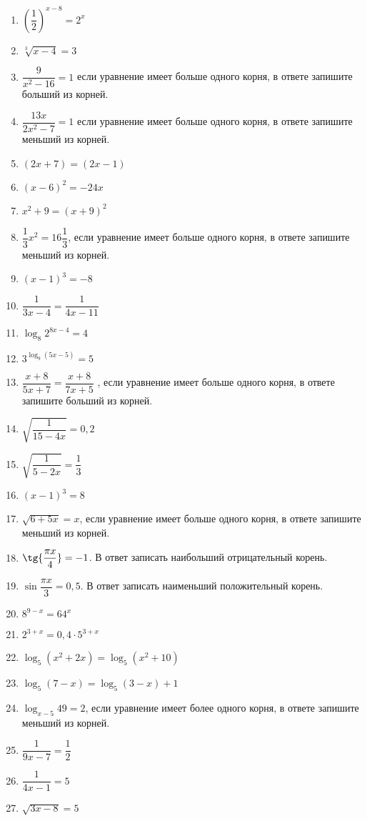 \begin{enumerate}
	\item $\left( \dfrac{1}{2}\right)^{x-8} = 2^x $
	\item $\sqrt[3]{x-4} = 3$
	\item $\dfrac{9}{x^2 - 16} = 1$ если уравнение имеет больше одного корня, в ответе запишите больший из корней.
	\item $\dfrac{13x}{2x^2 - 7} = 1$ если уравнение имеет больше одного корня, в ответе запишите меньший из корней.
	\item $\left(2x + 7\right) = \left(2x -1\right)  $
	\item $ \left( x-6\right)^2 = -24x $
	\item $ x^2 + 9 = \left(x+9\right)^2 $
	\item $ \dfrac{1}{3}x^2 = 16\dfrac{1}{3}$, если уравнение имеет больше одного корня, в ответе запишите меньший из корней.
	\item $ \left(x-1\right)^3 = -8 $
	\item $ \dfrac{1}{3x-4} = \dfrac{1}{4x-11}$
	\item $ \log_{8}2^{8x-4} = 4$
	\item $3^{\log_{9}\left(5x - 5\right) }  = 5$
	\item $\dfrac{x+8}{5x+7} = \dfrac{x+8}{7x+5}$ , если уравнение имеет больше одного корня, в ответе запишите больший из корней.
	\item $\sqrt{\dfrac{1}{15-4x}} = 0,2$
	\item $\sqrt{\dfrac{1}{5-2x}} = \dfrac{1}{3} $
	\item $\left( x-1\right)^3 = 8 $
	\item $\sqrt{6 + 5x} = x$, если уравнение имеет больше одного корня, в ответе запишите меньший из корней.
	\item $\tg{\dfrac{\pi x}{4}} = -1$. В ответ записать наибольший отрицательный корень.
	\item $\sin{\dfrac{\pi x}{3}} = 0,5$. В ответ записать наименьший положительный корень.
	\item $8^{9-x} = 64^x$
	\item $2^{3+x} = 0,4 \cdot 5^{3+x}$
	\item $ \log_{5}\left(x^2 + 2x \right) = \log_{5}\left( x^2 + 10\right)  $
	\item $ \log_{5}\left(7-x \right) = \log_{5}\left( 3-x\right) +1 $
	\item $ \log_{x-5}49 = 2 $, если уравнение имеет более одного корня, в ответе запишите меньший из корней.
	\item $\dfrac{1}{9x-7} = \dfrac{1}{2}$
	\item $ \dfrac{1}{4x-1} = 5$
	\item $ \sqrt{3x-8} = 5$

	\end{enumerate}